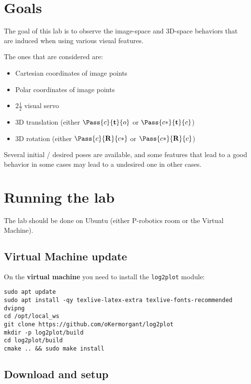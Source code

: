 \documentclass{ecnreport}
\author{O. Kermorgant}
\begin{document}


\section{Goals}

The goal of this lab is to observe the image-space and 3D-space behaviors that are induced when using various visual features.

The ones that are considered are:
\begin{itemize}
 \item Cartesian coordinates of image points
 \item Polar coordinates of image points
 \item $2\frac{1}{2}$ visual servo
 \item 3D translation (either $\Pass{c}{\mathbf{t}}{o}$ or $\Pass{c*}{\mathbf{t}}{c}$)
 \item 3D rotation (either $\Pass{c}{\mathbf{R}}{c*}$ or $\Pass{c*}{\mathbf{R}}{c}$)
\end{itemize}

Several initial / desired poses are available, and some features that lead to a good behavior in some cases may lead to a undesired one in other cases.

\section{Running the lab}

The lab should be done on Ubuntu (either P-robotics room or the Virtual Machine).\\

\subsection{Virtual Machine update}
On the \textbf{virtual machine} you need to install the \texttt{log2plot} module:
\begin{center}\bashstyle
 \begin{lstlisting}
sudo apt update
sudo apt install -qy texlive-latex-extra texlive-fonts-recommended dvipng
cd /opt/local_ws
git clone https://github.com/oKermorgant/log2plot
mkdir -p log2plot/build
cd log2plot/build
cmake .. && sudo make install
\end{lstlisting}
\end{center}

\subsection{Download and setup}
\end{document}
